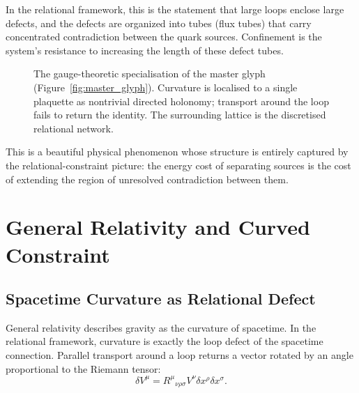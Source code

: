 \documentclass[12pt,a4paper,openany]{book}
\theoremstyle{plain}
\theoremstyle{definition}
\theoremstyle{remark}
\begin{document}
In the relational framework, this is the statement that large loops enclose large defects, and the defects are organized into tubes (flux tubes) that carry concentrated contradiction between the quark sources. Confinement is the system's resistance to increasing the length of these defect tubes.

\begin{figure}[h]
\centering
{}
\caption[Plaquette glyph, Chapter~9: gauge theory]{The gauge-theoretic specialisation of the master glyph (Figure~\ref{fig:master_glyph}). Curvature is localised to a single plaquette as nontrivial directed holonomy; transport around the loop fails to return the identity. The surrounding lattice is the discretised relational network.}
\label{fig:glyph_plaquette}
\end{figure}

This is a beautiful physical phenomenon whose structure is entirely captured by the relational-constraint picture: the energy cost of separating sources is the cost of extending the region of unresolved contradiction between them.

\chapter{General Relativity and Curved Constraint}

\section{Spacetime Curvature as Relational Defect}

General relativity describes gravity as the curvature of spacetime. In the relational framework, curvature is exactly the loop defect of the spacetime connection. Parallel transport around a loop returns a vector rotated by an angle proportional to the Riemann tensor:
\[
\delta V^\mu = R^\mu{}_{\nu\rho\sigma} V^\nu \delta x^\rho \delta x^\sigma.
\]
\end{document}
